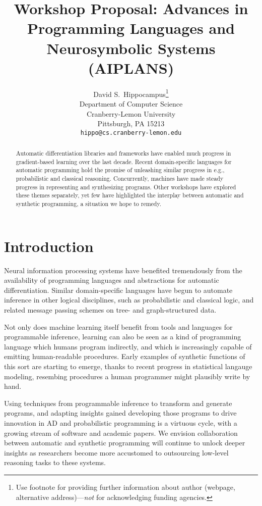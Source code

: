 \documentclass{article}
\title{Workshop Proposal: Advances in Programming Languages and Neurosymbolic Systems (AIPLANS)}
\author{%
    David S.~Hippocampus\thanks{Use footnote for providing further information
    about author (webpage, alternative address)---\emph{not} for acknowledging
    funding agencies.} \\
    Department of Computer Science\\
    Cranberry-Lemon University\\
    Pittsburgh, PA 15213 \\
    \texttt{hippo@cs.cranberry-lemon.edu} \\
}
\begin{document}
    \maketitle

    \begin{abstract}
        Automatic differentiation libraries and frameworks have enabled much progress in gradient-based learning over the last decade. Recent domain-specific languages for automatic programming hold the promise of unleashing similar progress in e.g., probabilistic and classical reasoning. Concurrently, machines have made steady progress in representing and synthesizing programs. Other workshops have explored these themes separately, yet few have highlighted the interplay between automatic and synthetic programming, a situation we hope to remedy.
    \end{abstract}

    \section{Introduction}

    Neural information processing systems have benefited tremendously from the availability of programming languages and abstractions for automatic differentiation. Similar domain-specific languages have begun to automate inference in other logical disciplines, such as probabilistic and classical logic, and related message passing schemes on tree- and graph-structured data.

    Not only does machine learning itself benefit from tools and languages for programmable inference, learning can also be seen as a kind of programming language which humans program indirectly, and which is increasingly capable of emitting human-readable procedures. Early examples of synthetic functions of this sort are starting to emerge, thanks to recent progress in statistical langauge modeling, resembing procedures a human programmer might plausibly write by hand.

    Using techniques from programmable inference to transform and generate programs, and adapting insights gained developing those programs to drive innovation in AD and probabilistic programming is a virtuous cycle, with a growing stream of software and academic papers. We envision collaboration between automatic and synthetic programming will continue to unlock deeper insights as researchers become more accustomed to outsourcing low-level reasoning tasks to these systems.
\end{document}
